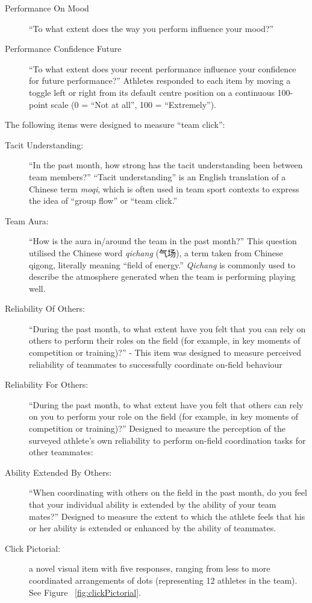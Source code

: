     \begin{description}
    \item[Performance On Mood] ``To what extent does the way you perform influence your mood?''
    \item [Performance Confidence Future] ``To what extent does your recent performance influence your confidence for future performance?''
    Athletes responded to each item by moving a toggle left or right from its default centre position on a continuous 100-point scale (0 = ``Not at all'', 100 = ``Extremely'').
    \end{description}



The following items were designed to measure ``team click'':
\begin{description}
  \item [Tacit Understanding:] ``In the past month, how strong has the tacit understanding been between team members?''  ``Tacit understanding'' is an English translation of a Chinese term \textit{moqi}, which is often used in team sport contexts to express the idea of  ``group flow'' or ``team click.''
  \item [Team Aura:] ``How is the aura in/around the team in the past month?'' This question utilised the Chinese word \textit{qichang} (气场), a term taken from Chinese qigong, literally meaning ``field of energy.'' \textit{Qichang} is commonly used to describe the atmosphere generated when the team is performing playing well.
  \item [Reliability Of Others:] ``During the past month, to what extent have you felt that you can rely on others to perform their roles on the field (for example, in key moments of competition or training)?'' - This item was designed to measure perceived reliability of teammates to successfully coordinate  on-field behaviour
  \item [Reliability For Others:] ``During the past month, to what extent have you felt that others can rely on you to perform your role on the field (for example, in key moments of competition or training)?'' Designed to measure the perception of the surveyed athlete's own reliability to perform on-field coordination tasks for other teammates:
  \item[Ability Extended By Others:] ``When coordinating with others on the field in the past month, do you feel that your individual ability is extended by the ability of your team mates?'' Designed to measure the extent to which the athlete feels that his or her ability is extended or enhanced by the ability of teammates.
  \item [Click Pictorial:] a novel visual item with five responses, ranging from less to more coordinated arrangements of dots (representing 12 athletes in the team). See Figure ~\ref{fig:clickPictorial}.
\end{description}

